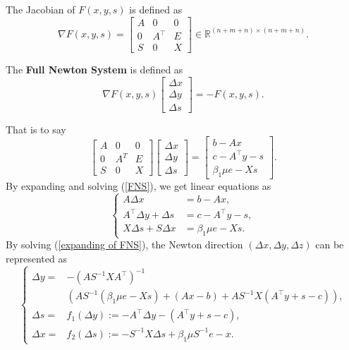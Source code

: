 The Jacobian of $F(x,y,s)$ is defined as 
\begin{equation}
    \nabla F(x, y, s)=\left[\begin{array}{ccc}
A & 0 & 0 \\
0 & A^{\top} & E \\
S & 0 & X
\end{array}\right] \in \mathbb{R}^{(n+m+n) \times (n+m+n)}.
\end{equation}
\begin{definition}
The \textbf{Full Newton System} is defined as
\begin{equation}
    \nabla F(x, y, s)\left[\begin{array}{l}
\Delta x \\
\Delta y \\
\Delta s
\end{array}\right]=-F(x, y, s) .
\end{equation}
\end{definition}
That is to say
\begin{equation}
    \label{FNS}
\left[\begin{array}{ccc}
A & 0 & 0 \\
0 & A^T & E \\
S & 0 & X
\end{array}\right]\left[\begin{array}{c}
\Delta x \\
\Delta y \\
\Delta s
\end{array}\right]=\left[\begin{array}{l}
b-A x \\
c-A^{\top} y-s \\
\beta_1 \mu e-Xs
\end{array}\right].
\end{equation}
By expanding and solving (\ref{FNS}), we get linear equations as
\begin{equation}\label{expanding of FNS}
\left\{
\begin{aligned}
A \Delta x & =b-A x, \\
A^{\top} \Delta y+\Delta s & =c-A^{\top} y-s, \\
X \Delta s+S \Delta x & =\beta_1 \mu e-X s .
\end{aligned}
\right.
\end{equation}
By solving (\ref{expanding of FNS}), the Newton direction $(\Delta x, \Delta y, \Delta z)$ can be represented as 
\begin{equation}\label{solution of FNS}
\left\{
\begin{aligned}
\Delta y= 
& -\left(A S^{-1} X A^{\top}\right)^{-1} \\
& \left(A S^{-1}\left(\beta_1\mu e-X s\right)+\left(A x-b\right)+A S^{-1} X\left(A^{\top} y+s-c\right)\right), \\
\Delta s = &f_1(\Delta y) := -A^{\top} \Delta y-\left(A^{\top} y+s-c\right), \\
\Delta x = &f_2(\Delta s) := -S^{-1} X \Delta s+\beta_1\mu S^{-1} e-x.
\end{aligned}
\right.
\end{equation}
